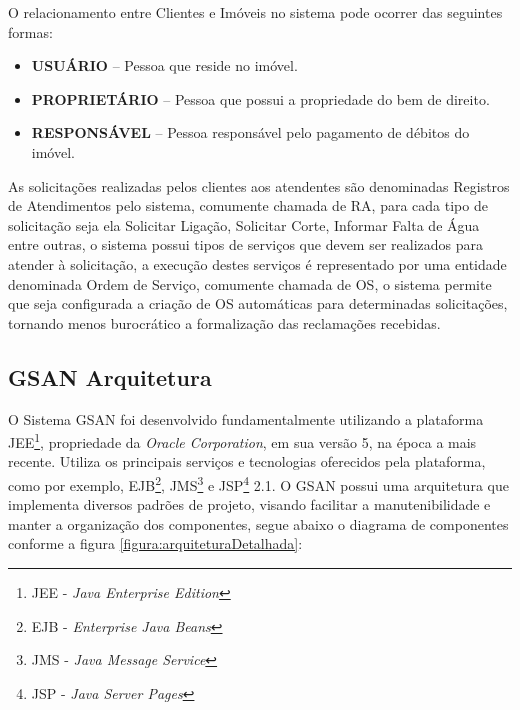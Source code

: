 O relacionamento entre Clientes e Imóveis no sistema pode ocorrer das seguintes formas:
\begin{itemize}
	\item \textbf{USUÁRIO} – Pessoa que reside no imóvel.
	\item \textbf{PROPRIETÁRIO} – Pessoa que possui a propriedade do bem de direito.
	\item \textbf{RESPONSÁVEL} – Pessoa responsável pelo pagamento de débitos do imóvel.	
\end{itemize}

As solicitações realizadas pelos clientes aos atendentes são denominadas Registros de Atendimentos pelo sistema, comumente chamada de RA, para cada tipo de solicitação seja ela Solicitar Ligação, Solicitar Corte, Informar Falta de Água entre outras, o sistema possui tipos de serviços que devem ser realizados para atender à solicitação, a execução destes serviços é representado por uma  entidade denominada Ordem de Serviço, comumente chamada de OS, o sistema permite que seja configurada a criação de OS automáticas para determinadas solicitações, tornando menos burocrático a formalização das reclamações recebidas.


\subsection{GSAN Arquitetura}
	
O Sistema GSAN foi desenvolvido fundamentalmente utilizando a plataforma JEE\footnote{JEE - \textit{Java Enterprise Edition}}, propriedade da \textit{Oracle Corporation}, em sua versão 5, na época a mais recente. Utiliza os principais serviços e tecnologias oferecidos pela plataforma, como por exemplo, EJB\footnote{EJB - \textit{Enterprise Java Beans}}, JMS\footnote{JMS - \textit{Java Message Service}} e JSP\footnote{JSP - \textit{Java Server Pages}} 2.1.
O GSAN possui uma arquitetura que implementa diversos padrões de projeto, visando facilitar a manutenibilidade e manter a organização dos componentes, segue abaixo o diagrama de componentes conforme a figura \ref{figura:arquiteturaDetalhada}:

